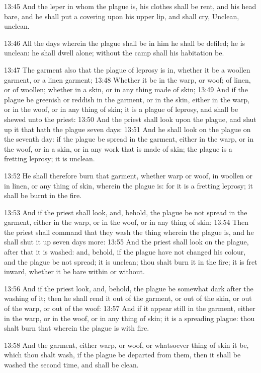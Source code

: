 13:45 And the leper in whom the plague is, his clothes shall be rent,
and his head bare, and he shall put a covering upon his upper lip, and
shall cry, Unclean, unclean.

13:46 All the days wherein the plague shall be in him he shall be
defiled; he is unclean: he shall dwell alone; without the camp shall
his habitation be.

13:47 The garment also that the plague of leprosy is in, whether it be
a woollen garment, or a linen garment; 13:48 Whether it be in the
warp, or woof; of linen, or of woollen; whether in a skin, or in any
thing made of skin; 13:49 And if the plague be greenish or reddish in
the garment, or in the skin, either in the warp, or in the woof, or in
any thing of skin; it is a plague of leprosy, and shall be shewed unto
the priest: 13:50 And the priest shall look upon the plague, and shut
up it that hath the plague seven days: 13:51 And he shall look on the
plague on the seventh day: if the plague be spread in the garment,
either in the warp, or in the woof, or in a skin, or in any work that
is made of skin; the plague is a fretting leprosy; it is unclean.

13:52 He shall therefore burn that garment, whether warp or woof, in
woollen or in linen, or any thing of skin, wherein the plague is: for
it is a fretting leprosy; it shall be burnt in the fire.

13:53 And if the priest shall look, and, behold, the plague be not
spread in the garment, either in the warp, or in the woof, or in any
thing of skin; 13:54 Then the priest shall command that they wash the
thing wherein the plague is, and he shall shut it up seven days more:
13:55 And the priest shall look on the plague, after that it is
washed: and, behold, if the plague have not changed his colour, and
the plague be not spread; it is unclean; thou shalt burn it in the
fire; it is fret inward, whether it be bare within or without.

13:56 And if the priest look, and, behold, the plague be somewhat dark
after the washing of it; then he shall rend it out of the garment, or
out of the skin, or out of the warp, or out of the woof: 13:57 And if
it appear still in the garment, either in the warp, or in the woof, or
in any thing of skin; it is a spreading plague: thou shalt burn that
wherein the plague is with fire.

13:58 And the garment, either warp, or woof, or whatsoever thing of
skin it be, which thou shalt wash, if the plague be departed from
them, then it shall be washed the second time, and shall be clean.

